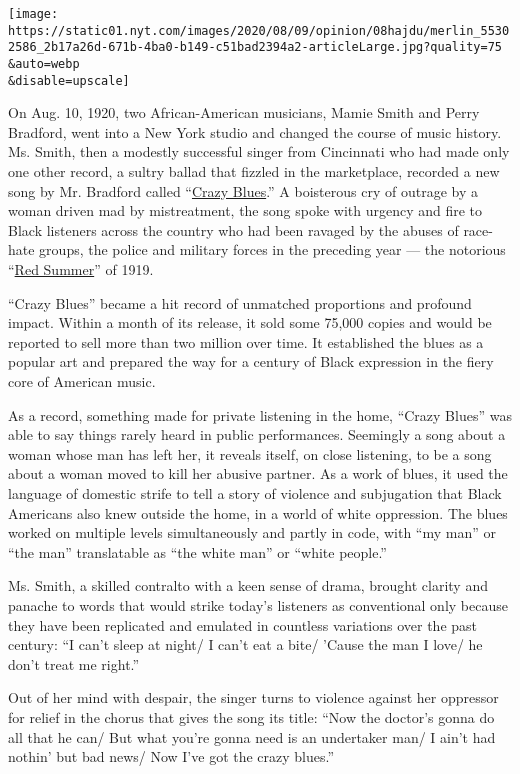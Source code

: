 \texttt{[image: https://static01.nyt.com/images/2020/08/09/opinion/08hajdu/merlin\_55302586\_2b17a26d-671b-4ba0-b149-c51bad2394a2-articleLarge.jpg?quality=75\\\&auto=webp\\\&disable=upscale]}

On Aug. 10, 1920, two African-American musicians, Mamie Smith and Perry
Bradford, went into a New York studio and changed the course of music
history. Ms. Smith, then a modestly successful singer from Cincinnati
who had made only one other record, a sultry ballad that fizzled in the
marketplace, recorded a new song by Mr. Bradford called
``\href{https://www.youtube.com/watch?v=qaz4Ziw_CfQ}{Crazy Blues}.'' A
boisterous cry of outrage by a woman driven mad by mistreatment, the
song spoke with urgency and fire to Black listeners across the country
who had been ravaged by the abuses of race-hate groups, the police and
military forces in the preceding year --- the notorious
``\href{https://time.com/5636454/what-is-red-summer/}{Red Summer}'' of
1919.

``Crazy Blues'' became a hit record of unmatched proportions and
profound impact. Within a month of its release, it sold some 75,000
copies and would be reported to sell more than two million over time. It
established the blues as a popular art and prepared the way for a
century of Black expression in the fiery core of American music.

As a record, something made for private listening in the home, ``Crazy
Blues'' was able to say things rarely heard in public performances.
Seemingly a song about a woman whose man has left her, it reveals
itself, on close listening, to be a song about a woman moved to kill her
abusive partner. As a work of blues, it used the language of domestic
strife to tell a story of violence and subjugation that Black Americans
also knew outside the home, in a world of white oppression. The blues
worked on multiple levels simultaneously and partly in code, with ``my
man'' or ``the man'' translatable as ``the white man'' or ``white
people.''

Ms. Smith, a skilled contralto with a keen sense of drama, brought
clarity and panache to words that would strike today's listeners as
conventional only because they have been replicated and emulated in
countless variations over the past century: ``I can't sleep at night/ I
can't eat a bite/ 'Cause the man I love/ he don't treat me right.''

Out of her mind with despair, the singer turns to violence against her
oppressor for relief in the chorus that gives the song its title: ``Now
the doctor's gonna do all that he can/ But what you're gonna need is an
undertaker man/ I ain't had nothin' but bad news/ Now I've got the crazy
blues.''


